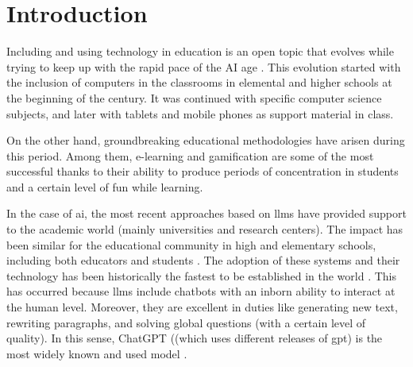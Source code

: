 \documentclass[pdflatex,sn-mathphys-num]{sn-jnl}%
\begin{document}



\maketitle

\acresetall

\section{Introduction}
\label{sec:intro}
Including and using technology in education is an open topic that evolves while trying to keep up with the rapid pace of the AI age \cite{ratheeswari2018information}. This evolution started with the inclusion of computers in the classrooms in elemental and higher schools at the beginning of the century. It was continued with specific computer science subjects, and later with tablets and mobile phones as support material in class.

On the other hand, groundbreaking educational methodologies have arisen during this period. Among them, e-learning \cite{liu2023towards} and gamification \cite{oliveira2023tailored} are some of the most successful thanks to their ability to produce periods of concentration in students and a certain level of fun while learning.

In the case of \ac{ai}, the most recent approaches based on \acp{llm} have provided support to the academic world (mainly universities and research centers). The impact has been similar for the educational community in high and elementary schools, including both educators and students \cite{kasneci2023chatgpt}. The adoption of these systems and their technology has been historically the fastest to be established in the world \cite{makridakis2023large}. This has occurred because \acp{llm} include chatbots with an inborn ability to interact at the human level. Moreover, they are excellent in duties like generating new text, rewriting paragraphs, and solving global questions (with a certain level of quality). In this sense, ChatGPT ((which uses different releases of \ac{gpt}) is the most widely known and used model \cite{lund2023chatting}.
\end{document}
